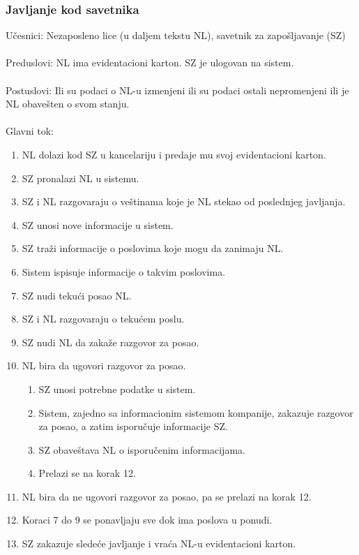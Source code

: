 \subsubsection{Javljanje kod savetnika}
\label{su: javljanje kod savetnika}

\noindent U\v cesnici: Nezaposleno lice (u daljem tekstu NL), savetnik za zapo\v sljavanje (SZ)
\\
\\ Preduslovi: NL ima evidentacioni karton. SZ je ulogovan na sistem. 
\\
\\ Postuslovi: Ili su podaci o NL-u izmenjeni ili su podaci ostali nepromenjeni ili je NL obave\v sten o svom stanju.
\\ 
\\ Glavni tok:
\begin{enumerate}
	\item NL dolazi kod SZ u kancelariju i predaje mu svoj evidentacioni karton.
	\item SZ pronalazi NL u sistemu.
	\item SZ i NL razgovaraju o ve\v stinama koje je NL stekao od poslednjeg javljanja.
	\item SZ unosi nove informacije u sistem.
	\item SZ tra\v zi informacije o poslovima koje mogu da zanimaju NL.
	\item Sistem ispisuje informacije o takvim poslovima. 
	\item SZ nudi teku\' ci posao NL.
	\item SZ i NL razgovaraju o teku\' cem poslu.
	\item SZ nudi NL da zaka\v ze razgovor za posao.
	\item NL bira da ugovori razgovor za posao.
	\begin{enumerate}
		\item SZ unosi potrebne podatke u sistem.
		\item Sistem, zajedno sa informacionim sistemom kompanije, zakazuje razgovor za posao, a zatim isporu\v cuje informacije SZ.
		\item SZ obave\v stava NL o isporu\v cenim informacijama.
		\item Prelazi se na korak 12.
	\end{enumerate}
	\item NL bira da ne ugovori razgovor za posao, pa se prelazi na korak 12.
	\item Koraci 7 do 9 se ponavljaju sve dok ima poslova u ponudi.
	\item SZ zakazuje slede\' ce javljanje i vra\' ca NL-u evidentacioni karton.
\end{enumerate}

